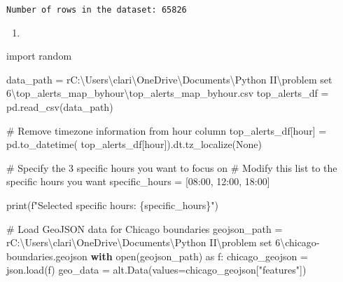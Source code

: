 \documentclass[
  letterpaper,
  DIV=11,
  numbers=noendperiod]{scrartcl}
\newenvironment{Shaded}{\begin{snugshade}}{\end{snugshade}}
\newcommand{\BuiltInTok}[1]{\textcolor[rgb]{0.00,0.23,0.31}{#1}}
\newcommand{\CommentTok}[1]{\textcolor[rgb]{0.37,0.37,0.37}{#1}}
\newcommand{\ControlFlowTok}[1]{\textcolor[rgb]{0.00,0.23,0.31}{\textbf{#1}}}
\newcommand{\ImportTok}[1]{\textcolor[rgb]{0.00,0.46,0.62}{#1}}
\newcommand{\NormalTok}[1]{\textcolor[rgb]{0.00,0.23,0.31}{#1}}
\newcommand{\OperatorTok}[1]{\textcolor[rgb]{0.37,0.37,0.37}{#1}}
\newcommand{\SpecialCharTok}[1]{\textcolor[rgb]{0.37,0.37,0.37}{#1}}
\newcommand{\SpecialStringTok}[1]{\textcolor[rgb]{0.13,0.47,0.30}{#1}}
\newcommand{\StringTok}[1]{\textcolor[rgb]{0.13,0.47,0.30}{#1}}
\newcommand{\VariableTok}[1]{\textcolor[rgb]{0.07,0.07,0.07}{#1}}
\newcommand{\VerbatimStringTok}[1]{\textcolor[rgb]{0.13,0.47,0.30}{#1}}
\providecommand{\tightlist}{%
  \setlength{\itemsep}{0pt}\setlength{\parskip}{0pt}}\usepackage{longtable,booktabs,array}
\begin{document}
\begin{verbatim}
Number of rows in the dataset: 65826
\end{verbatim}

\begin{enumerate}
\def\labelenumi{\alph{enumi}.}
\setcounter{enumi}{2}
\tightlist
\item
\end{enumerate}

\begin{Shaded}
\begin{Highlighting}[]
\ImportTok{import}\NormalTok{ random}
\end{Highlighting}
\end{Shaded}

\begin{Shaded}
\begin{Highlighting}[]
\NormalTok{data\_path }\OperatorTok{=} \VerbatimStringTok{r\textquotesingle{}C:\textbackslash{}Users\textbackslash{}clari\textbackslash{}OneDrive\textbackslash{}Documents\textbackslash{}Python II\textbackslash{}problem set 6\textbackslash{}top\_alerts\_map\_byhour\textbackslash{}top\_alerts\_map\_byhour.csv\textquotesingle{}}
\NormalTok{top\_alerts\_df }\OperatorTok{=}\NormalTok{ pd.read\_csv(data\_path)}

\CommentTok{\# Remove timezone information from \textquotesingle{}hour\textquotesingle{} column}
\NormalTok{top\_alerts\_df[}\StringTok{\textquotesingle{}hour\textquotesingle{}}\NormalTok{] }\OperatorTok{=}\NormalTok{ pd.to\_datetime(}
\NormalTok{    top\_alerts\_df[}\StringTok{\textquotesingle{}hour\textquotesingle{}}\NormalTok{]).dt.tz\_localize(}\VariableTok{None}\NormalTok{)}

\CommentTok{\# Specify the 3 specific hours you want to focus on}
\CommentTok{\# Modify this list to the specific hours you want}
\NormalTok{specific\_hours }\OperatorTok{=}\NormalTok{ [}\StringTok{\textquotesingle{}08:00\textquotesingle{}}\NormalTok{, }\StringTok{\textquotesingle{}12:00\textquotesingle{}}\NormalTok{, }\StringTok{\textquotesingle{}18:00\textquotesingle{}}\NormalTok{]}

\BuiltInTok{print}\NormalTok{(}\SpecialStringTok{f"Selected specific hours: }\SpecialCharTok{\{}\NormalTok{specific\_hours}\SpecialCharTok{\}}\SpecialStringTok{"}\NormalTok{)}

\CommentTok{\# Load GeoJSON data for Chicago boundaries}
\NormalTok{geojson\_path }\OperatorTok{=} \VerbatimStringTok{r\textquotesingle{}C:\textbackslash{}Users\textbackslash{}clari\textbackslash{}OneDrive\textbackslash{}Documents\textbackslash{}Python II\textbackslash{}problem set 6\textbackslash{}chicago{-}boundaries.geojson\textquotesingle{}}
\ControlFlowTok{with} \BuiltInTok{open}\NormalTok{(geojson\_path) }\ImportTok{as}\NormalTok{ f:}
\NormalTok{    chicago\_geojson }\OperatorTok{=}\NormalTok{ json.load(f)}
\NormalTok{geo\_data }\OperatorTok{=}\NormalTok{ alt.Data(values}\OperatorTok{=}\NormalTok{chicago\_geojson[}\StringTok{"features"}\NormalTok{])}


\end{Highlighting}
\end{Shaded}
\end{document}
